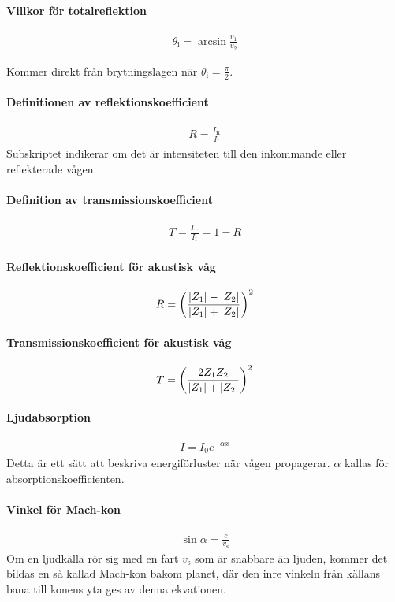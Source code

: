 \paragraph{Villkor för totalreflektion}
\begin{align*}
	\theta_{\text{i}} = \arcsin{\frac{v_1}{v_2}}
\end{align*}

\deriv
Kommer direkt från brytningslagen när $\theta_{\text{i}} = \frac{\pi}{2}$.

\paragraph{Definitionen av reflektionskoefficient}
\begin{align*}
	R = \frac{I_\text{R}}{I_\text{I}}
\end{align*}
Subskriptet indikerar om det är intensiteten till den inkommande eller reflekterade vågen.

\paragraph{Definition av transmissionskoefficient}
\begin{align*}
	T = \frac{I_\text{T}}{I_\text{I}} = 1 - R
\end{align*}

\paragraph{Reflektionskoefficient för akustisk våg}
\begin{align*}
	R = \left(\frac{\abs{Z_1} - \abs{Z_2}}{\abs{Z_1} + \abs{Z_2}}\right)^2
\end{align*}

\paragraph{Transmissionskoefficient för akustisk våg}
\begin{align*}
	T = \left(\frac{2Z_1Z_2}{\abs{Z_1} + \abs{Z_2}}\right)^2
\end{align*}

\paragraph{Ljudabsorption}
\begin{align*}
	I = I_0e^{-\alpha x}
\end{align*}
Detta är ett sätt att beskriva energiförluster när vågen propagerar. $\alpha$ kallas för absorptionskoefficienten.

\paragraph{Vinkel för Mach-kon}
\begin{align*}
	\sin{\alpha} = \frac{c}{v_{\text{s}}}
\end{align*}
Om en ljudkälla rör sig med en fart $v_{\text{s}}$ som är snabbare än ljuden, kommer det bildas en så kallad Mach-kon bakom planet, där den inre vinkeln från källans bana till konens yta ges av denna ekvationen.

\deriv